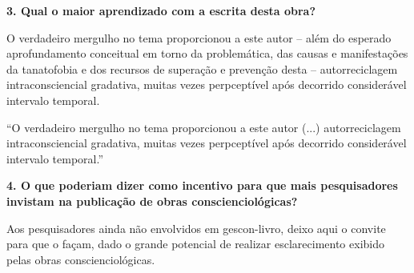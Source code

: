 \documentclass{gescons}
\begin{document}
\begin{multicols}{2}
\textbf{3. Qual o maior aprendizado com a escrita desta obra?}

O verdadeiro mergulho no tema proporcionou a este autor -- além do
esperado aprofundamento conceitual em torno da problemática, das causas
e manifestações da tanatofobia e dos recursos de superação e prevenção
desta -- autorreciclagem intraconsciencial gradativa, muitas vezes
perpceptível após decorrido considerável intervalo temporal.

\begin{pullquote}
    ``O verdadeiro mergulho no tema proporcionou a este autor  (...)  autorreciclagem intraconsciencial gradativa, muitas vezes perpceptível após decorrido considerável intervalo temporal.''
\end{pullquote}

\textbf{4. O que poderiam dizer como incentivo para que mais pesquisadores invistam na publicação de obras conscienciológicas?}

Aos pesquisadores ainda não envolvidos em gescon-livro, deixo aqui o
convite para que o façam, dado o grande potencial de realizar
esclarecimento exibido pelas obras conscienciológicas.


    \end{multicols}
\end{document}
